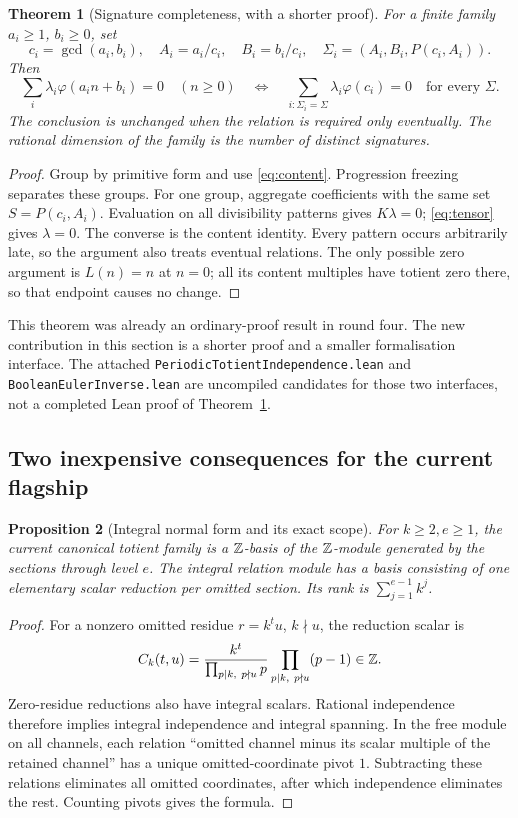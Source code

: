 \documentclass[11pt,a4paper]{article}
\newtheorem{theorem}{Theorem}[section]
\newtheorem{proposition}[theorem]{Proposition}
\theoremstyle{definition}\newtheorem{definition}[theorem]{Definition}
\theoremstyle{remark}\newtheorem*{remark}{Remark}
\newcommand{\ph}{\varphi}\newcommand{\Span}{\operatorname{span}}\newcommand{\ord}{\operatorname{ord}}
\begin{document}
\begin{theorem}[Signature completeness, with a shorter proof]\label{thm:signature}
For a finite family $a_i\ge1$, $b_i\ge0$, set
\[
 c_i=\gcd(a_i,b_i),\quad A_i=a_i/c_i,\quad B_i=b_i/c_i,
 \quad \Sigma_i=(A_i,B_i,P(c_i,A_i)).
\]
Then
\[
 \sum_i\lambda_i\ph(a_i n+b_i)=0\quad(n\ge0)
 \quad\Longleftrightarrow\quad
 \sum_{i:\Sigma_i=\Sigma}\lambda_i\ph(c_i)=0\quad\text{for every }\Sigma.
\]
The conclusion is unchanged when the relation is required only eventually.
The rational dimension of the family is the number of distinct signatures.
\end{theorem}
\begin{proof}
Group by primitive form and use \eqref{eq:content}. Progression freezing
separates these groups. For one group, aggregate coefficients with the same
set $S=P(c_i,A_i)$. Evaluation on all divisibility patterns gives $K\lambda=0$;
\eqref{eq:tensor} gives $\lambda=0$. The converse is the content identity.
Every pattern occurs arbitrarily late, so the argument also treats eventual
relations. The only possible zero argument is $L(n)=n$ at $n=0$; all its
content multiples have totient zero there, so that endpoint causes no change.
\end{proof}

This theorem was already an ordinary-proof result in round four. The new
contribution in this section is a shorter proof and a smaller formalisation
interface. The attached \texttt{PeriodicTotientIndependence.lean} and
\texttt{BooleanEulerInverse.lean} are uncompiled candidates for those two
interfaces, not a completed Lean proof of Theorem~\ref{thm:signature}.

\subsection{Two inexpensive consequences for the current flagship}

\begin{proposition}[Integral normal form and its exact scope]\label{prop:integral}
For $k\ge2,e\ge1$, the current canonical totient family is a $\mathbb Z$-basis of the
$\mathbb Z$-module generated by the sections through level $e$. The integral relation
module has a basis consisting of one elementary scalar reduction per omitted
section. Its rank is $\sum_{j=1}^{e-1}k^j$.
\end{proposition}
\begin{proof}
For a nonzero omitted residue $r=k^tu$, $k\nmid u$, the reduction scalar is
\[
 C_k(t,u)=\frac{k^t}{\prod_{p\mid k,\ p\nmid u}p}
             \prod_{p\mid k,\ p\nmid u}(p-1)\in\mathbb Z.
\]
Zero-residue reductions also have integral scalars. Rational independence
therefore implies integral independence and integral spanning. In the free
module on all channels, each relation ``omitted channel minus its scalar
multiple of the retained channel'' has a unique omitted-coordinate pivot
$1$. Subtracting these relations eliminates all omitted coordinates, after
which independence eliminates the rest. Counting pivots gives the formula.
\end{proof}
\end{document}
